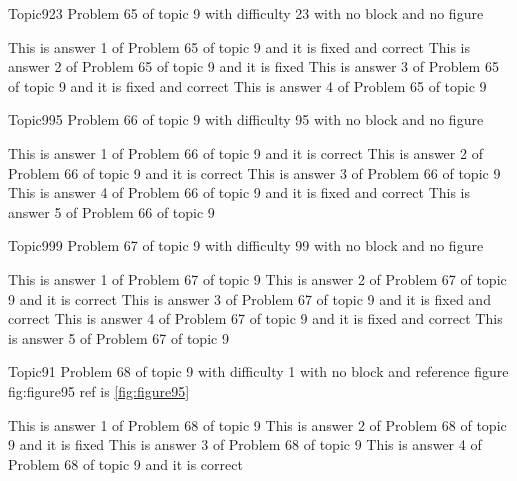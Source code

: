 \documentclass[master]{exam}
\begin{document}
\begin{problem}{Topic9}{23}
	Problem 65 of topic 9 with difficulty 23 with no block and no figure
	\begin{answers}
		 This is answer 1 of Problem 65 of topic 9 and it is fixed and correct
		\answer[fixed] This is answer 2 of Problem 65 of topic 9 and it is fixed
		 This is answer 3 of Problem 65 of topic 9 and it is fixed and correct
		\answer This is answer 4 of Problem 65 of topic 9 
	\end{answers}
\end{problem}

\begin{problem}{Topic9}{95}
	Problem 66 of topic 9 with difficulty 95 with no block and no figure
	\begin{answers}
		\answer[correct] This is answer 1 of Problem 66 of topic 9 and it is correct
		\answer[correct] This is answer 2 of Problem 66 of topic 9 and it is correct
		\answer This is answer 3 of Problem 66 of topic 9 
		 This is answer 4 of Problem 66 of topic 9 and it is fixed and correct
		\answer This is answer 5 of Problem 66 of topic 9 
	\end{answers}
\end{problem}

\begin{problem}{Topic9}{99}
	Problem 67 of topic 9 with difficulty 99 with no block and no figure
	\begin{answers}
		\answer This is answer 1 of Problem 67 of topic 9 
		\answer[correct] This is answer 2 of Problem 67 of topic 9 and it is correct
		 This is answer 3 of Problem 67 of topic 9 and it is fixed and correct
		 This is answer 4 of Problem 67 of topic 9 and it is fixed and correct
		\answer This is answer 5 of Problem 67 of topic 9 
	\end{answers}
\end{problem}

\begin{problem}{Topic9}{1}
	Problem 68 of topic 9 with difficulty 1 with no block and reference figure fig:figure95 ref is \ref{fig:figure95}
	\begin{answers}
		\answer This is answer 1 of Problem 68 of topic 9 
		\answer[fixed] This is answer 2 of Problem 68 of topic 9 and it is fixed
		\answer This is answer 3 of Problem 68 of topic 9 
		\answer[correct] This is answer 4 of Problem 68 of topic 9 and it is correct
	\end{answers}
\end{problem}
\end{document}
